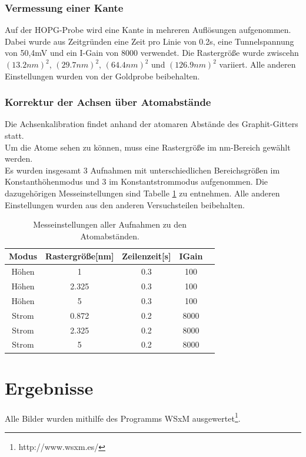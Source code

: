 \documentclass[12pt,a4paper]{article}
\begin{document}
\subsubsection{Vermessung einer Kante}
Auf der HOPG-Probe wird eine Kante in mehreren Auflösungen aufgenommen. Dabei wurde aus Zeitgründen eine Zeit pro Linie von 0.2s, eine Tunnelspannung von 50,4mV und ein I-Gain von 8000 verwendet. Die Rastergröße wurde zwiscehn $(13.2nm)^2$, $(29.7nm)^2$, $(64.4nm)^2$ und $(126.9nm)^2$ variiert. Alle anderen Einstellungen wurden von der Goldprobe beibehalten.

\subsubsection{Korrektur der Achsen über Atomabstände}
Die Achsenkalibration findet anhand der atomaren Abstände des Graphit-Gitters statt.\\
Um die Atome sehen zu können, muss eine Rastergröße im nm-Bereich gewählt werden.\\
Es wurden insgesamt 3 Aufnahmen mit unterschiedlichen Bereichsgrößen im Konstanthöhenmodus und 3 im Konstantstrommodus aufgenommen. Die dazugehörigen Messeinstellungen sind Tabelle \ref{tab:Atome_Einstellungen} zu entnehmen. Alle anderen Einstellungen wurden aus den anderen Versuchsteilen beibehalten.\\


\begin{table}
\centering
\begin{tabular}{|c|c|c|c|c|}
\hline 
Modus & Rastergröße[nm] & Zeilenzeit[s] & IGain\\ 
\hline 
Höhen & 1 & 0.3 & 100\\ 
\hline 
Höhen & 2.325 & 0.3 & 100\\ 
\hline 
Höhen & 5 & 0.3 & 100\\ 
\hline 
Strom & 0.872 & 0.2 & 8000\\ 
\hline 
Strom & 2.325 & 0.2 & 8000\\ 
\hline 
Strom & 5 & 0.2 & 8000\\ 
\hline 
\end{tabular} 
\caption{Messeinstellungen aller Aufnahmen zu den Atomabständen.}
\label{tab:Atome_Einstellungen}
\end{table}

\section{Ergebnisse}
Alle Bilder wurden mithilfe des Programms WSxM ausgewertet\footnote{http://www.wsxm.es/}.
\end{document}
